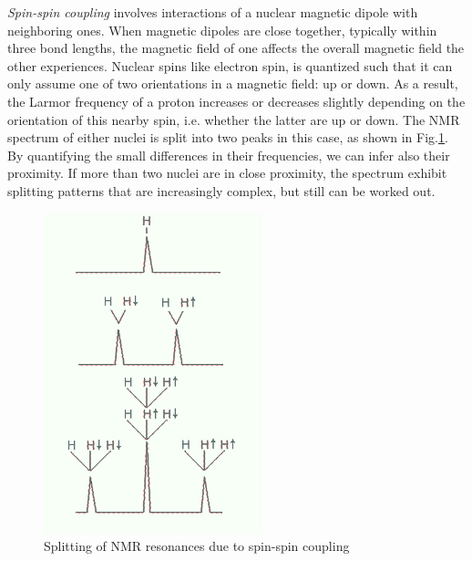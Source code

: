{\it Spin-spin coupling} involves interactions of a nuclear magnetic dipole with neighboring ones. When magnetic dipoles are close together, typically within three bond lengths, the magnetic field of one affects the overall magnetic field the other experiences. Nuclear spins like electron spin, is quantized such that it can only assume one of two orientations in a magnetic field: up or down. As a result, the Larmor frequency of a proton increases or decreases slightly depending on the orientation of this nearby spin, i.e. whether the latter are up or down.  The NMR spectrum of either nuclei is split into two peaks in this case, as shown in Fig.\ref{Fig9-22}. By quantifying the small differences in their frequencies, we can infer also their proximity. If more than two nuclei are in close proximity, the spectrum exhibit splitting patterns that are increasingly complex, but still can be worked out.
\begin{figure}[!htb]
	\centering
	\includegraphics[width=2.5in]{./figures/Topic9/Fig9-22.png}
	\caption{ Splitting of NMR resonances due to spin-spin coupling}
 	\label{Fig9-22}
\end{figure}

